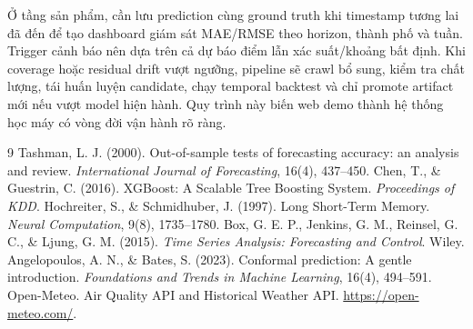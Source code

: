 \documentclass[11pt,a4paper]{article}
\begin{document}
Ở tầng sản phẩm, cần lưu prediction cùng ground truth khi timestamp tương lai đã đến để tạo dashboard giám sát MAE/RMSE theo horizon, thành phố và tuần. Trigger cảnh báo nên dựa trên cả dự báo điểm lẫn xác suất/khoảng bất định. Khi coverage hoặc residual drift vượt ngưỡng, pipeline sẽ crawl bổ sung, kiểm tra chất lượng, tái huấn luyện candidate, chạy temporal backtest và chỉ promote artifact mới nếu vượt model hiện hành. Quy trình này biến web demo thành hệ thống học máy có vòng đời vận hành rõ ràng.

\begin{thebibliography}{9}
 Tashman, L. J. (2000). Out-of-sample tests of forecasting accuracy: an analysis and review. \textit{International Journal of Forecasting}, 16(4), 437--450.
 Chen, T., \& Guestrin, C. (2016). XGBoost: A Scalable Tree Boosting System. \textit{Proceedings of KDD}.
 Hochreiter, S., \& Schmidhuber, J. (1997). Long Short-Term Memory. \textit{Neural Computation}, 9(8), 1735--1780.
 Box, G. E. P., Jenkins, G. M., Reinsel, G. C., \& Ljung, G. M. (2015). \textit{Time Series Analysis: Forecasting and Control}. Wiley.
 Angelopoulos, A. N., \& Bates, S. (2023). Conformal prediction: A gentle introduction. \textit{Foundations and Trends in Machine Learning}, 16(4), 494--591.
 Open-Meteo. Air Quality API and Historical Weather API. \url{https://open-meteo.com/}.
\end{thebibliography}
\end{document}
